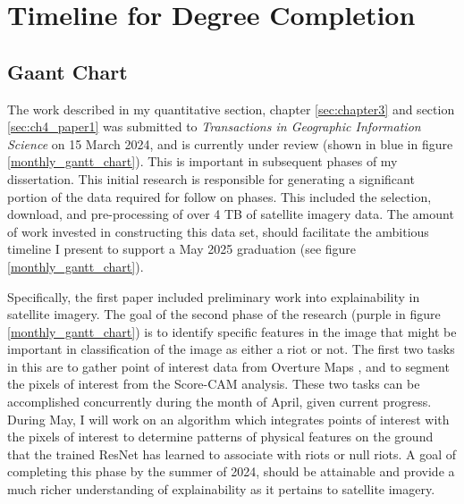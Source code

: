 
\chapter{Timeline for Degree Completion} %
\label{Chapter5} %



\section{Gaant Chart}
The work described in my quantitative section, chapter \ref{sec:chapter3} and section \ref{sec:ch4_paper1} was submitted to \textit{Transactions in Geographic Information Science} on 15 March 2024, and is currently under review (shown in blue in figure \ref{monthly_gantt_chart}).  This is important in subsequent phases of my dissertation.  This initial research is responsible for generating a significant portion of the data required for follow on phases.  This included the selection, download, and pre-processing of over 4 TB of satellite imagery data. The amount of work invested in constructing this data set, should facilitate the ambitious timeline I present to support a May 2025 graduation (see figure \ref{monthly_gantt_chart}). 

Specifically, the first paper included preliminary work into explainability in satellite imagery.  The goal of the second phase of the research (purple in figure \ref{monthly_gantt_chart}) is to identify specific features in the image that might be important in classification of the image as either a riot or not.  The first two tasks in this are to gather point of interest data from Overture Maps \citep{OvertureMapsFoundation2023}, and to segment the pixels of interest from the Score-CAM analysis.  These two tasks can be accomplished concurrently during the month of April, given current progress.  During May, I will work on an algorithm which integrates points of interest with the pixels of interest to determine patterns of physical features on the ground that the trained ResNet has learned to associate with riots or null riots.  A goal of completing this phase by the summer of 2024, should be attainable and provide a much richer understanding of explainability as it pertains to satellite imagery.

